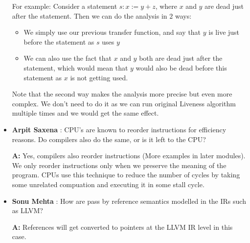 \begin{itemize}
                    For example: Consider a statement $s: x := y + z$, where $x$ and $y$ are dead just after the statement. Then we can do the analysis in $2$ ways:
                    \begin{itemize}
                        \item We simply use our previous transfer function, and say that $y$ is live just before the statement as $s$ uses $y$
                        \item We can also use the fact that $x$ and $y$ both are dead just after the statement, which would mean that $y$ would also be dead before this statement as $x$ is not getting used.
                    \end{itemize}
                    Note that the second way makes the analysis more precise but even more complex. We don't need to do it as we can run original Liveness algorithm multiple times and we would get the same effect.

    \item \textbf{Arpit Saxena} : CPU's are known to reorder instructions for efficiency reasons. Do compilers also do the same, or is it left to the CPU?
            
            \textbf{A:} Yes, compilers also reorder instructions (More examples in later modules). We only reorder instructions only when we preserve the meaning of the program. CPUs use this technique to reduce the number of cycles by taking some unrelated compuation and executing it in some stall cycle.

    \item \textbf{Sonu Mehta} : How are pass by reference semantics modelled in the IRs such as LLVM?
                    
            \textbf{A:} References will get converted to pointers at the LLVM IR level in this case.

\end{itemize}